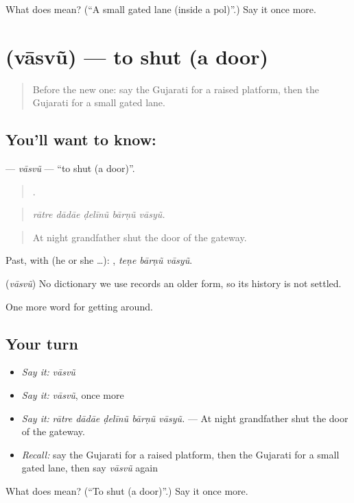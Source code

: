 \begin{tcolorbox}[breakable,colback=teal!4,colframe=teal!35!black,title={Before you move on}]
What does  mean? (\textquotedblleft{}A small gated lane (inside a pol)\textquotedblright{}.) Say it once more.
\end{tcolorbox}
\section[\texorpdfstring{\gu{વાસવું} (vāsvũ)}{વાસવું (vāsvũ)}]{ (vāsvũ) — to shut (a door)}

\label{lesson:GU-C417-vasvu-shut}



\begin{quote}
Before the new one: say the Gujarati for a raised platform, then the Gujarati for a small gated lane.
\end{quote}

\subsection*{You'll want to know: }
\textbf{} — \emph{vāsvũ} — \textquotedblleft{}to shut (a door)\textquotedblright{}.

\begin{quote}
    .
\end{quote}

\begin{quote}
\emph{rātre dādāe ḍelīnũ bārṇũ vāsyũ.}
\end{quote}

\begin{quote}
At night grandfather shut the door of the gateway.
\end{quote}

Past, with  (he or she …):   , \emph{teṇe bārṇũ vāsyũ}.

\begin{cousinweb}
\textbf{} (\emph{vāsvũ}) No dictionary we use records an older form, so its history is not settled.
\end{cousinweb}

\begin{grammarlens}[title={What you've built}]
One more word for getting around.
\end{grammarlens}

\subsection*{Your turn}
\begin{itemize}
\raggedright
  \item \emph{Say it:} \emph{vāsvũ}
  \item \emph{Say it:} \emph{vāsvũ}, once more
  \item \emph{Say it:} \emph{rātre dādāe ḍelīnũ bārṇũ vāsyũ.} — At night grandfather shut the door of the gateway.
  \item \emph{Recall:} say the Gujarati for a raised platform, then the Gujarati for a small gated lane, then say \emph{vāsvũ} again
\end{itemize}

\begin{tcolorbox}[breakable,colback=teal!4,colframe=teal!35!black,title={Before you move on}]
What does  mean? (\textquotedblleft{}To shut (a door)\textquotedblright{}.) Say it once more.
\end{tcolorbox}
